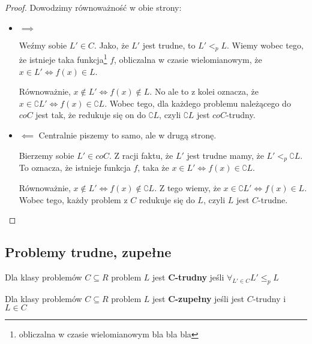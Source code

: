 \begin{proof}

Dowodzimy równoważność w obie strony:

\begin{itemize}
    \item     \( \implies \)
    
    Weźmy sobie \( L' \in C\). Jako, że \(L'\) jest trudne, to \(L' <_{p} L\).  Wiemy wobec tego, że istnieje taka funkcja\footnote{obliczalna w czasie wielomianowym bla bla bla} \(f\), obliczalna w czasie wielomianowym, że \( x \in L' \iff f(x) \in L\).
    
    Równoważnie, \( x \not\in L' \iff f(x) \not \in L\). No ale to z kolei oznacza, że \( x \in \complement{L'} \iff f(x) \in \complement{L}\). Wobec tego, dla każdego problemu należącego do \(coC\) jest tak, że redukuje się on do \( \complement{L} \), czyli \(\complement{L}\) jest \(coC\)-trudny.

    \item \( \impliedby \) 
    Centralnie piszemy to samo, ale w drugą stronę.
    
    
    Bierzemy sobie \( L' \in coC\). Z racji faktu, że \(L'\) jest trudne mamy, że \(L' <_{p} \complement{L}\). To oznacza, że istnieje funkcja \(f\), taka że \( x \in L' \iff f(x) \in \complement{L} \). 
    
    Równoważnie, \( x \not \in L' \iff f(x) \not \in \complement{L} \). Z tego wiemy, że \( x \in \complement{L'} \iff f(x) \in L \). Wobec tego, każdy problem z \(C\) redukuje się do \(L\), czyli \(L\) jest \(C\)-trudne. 
    

\end{itemize}

\end{proof}

\subsection{Problemy trudne, zupełne}

\begin{definition}
    Dla klasy problemów \( C \subseteq R \) problem \( L \) jest \textbf{C-trudny} jeśli \( \forall_{L' \in C} L' \leq_p L \)
\end{definition}

\begin{definition}
    Dla klasy problemów \( C \subseteq R \) problem \( L \) jest \textbf{C-zupełny} jeśli jest \(C\)-trudny i \( L \in C \)
\end{definition}

